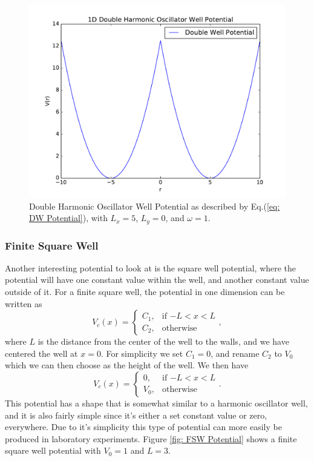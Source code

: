 \documentclass[../main.tex]{subfiles}
\begin{document}
\begin{figure}[!ht]
    \centering
    \includegraphics[scale=0.7]{figures/DW_Potential}
    \caption{Double Harmonic Oscillator Well Potential as described by Eq.(\ref{eq: DW Potential}), with $L_x = 5$, $L_y = 0$, and $\omega = 1$.}
    \label{fig: DW Potential}
\end{figure}

\subsubsection{Finite Square Well}

Another interesting potential to look at is the square well potential, where the potential will have one constant value within the well, and another constant value outside of it. For a finite square well, the potential in one dimension can be written as
\begin{equation}
    V_c(x) = \begin{cases}
  C_1, & \mbox{if $-L < x < L$} \\
  C_2, & \mbox{otherwise}
\end{cases},
\end{equation}
where $L$ is the distance from the center of the well to the walls, and we have centered the well at $x=0$. For simplicity we set $C_1 = 0$, and rename $C_2$ to $V_0$ which we can then choose as the height of the well. We then have
\begin{equation}\label{eq: FSW Potential}
    V_c(x) = \begin{cases}
  0, & \mbox{if $-L < x < L$} \\
  V_0, & \mbox{otherwise}
\end{cases}.
\end{equation}
This potential has a shape that is somewhat similar to a harmonic oscillator well, and it is also fairly simple since it's either a set constant value or zero, everywhere. Due to it's simplicity this type of potential can more easily be produced in laboratory experiments. Figure \ref{fig: FSW Potential} shows a finite square well potential with $V_0 = 1$ and $L = 3$.
\end{document}
